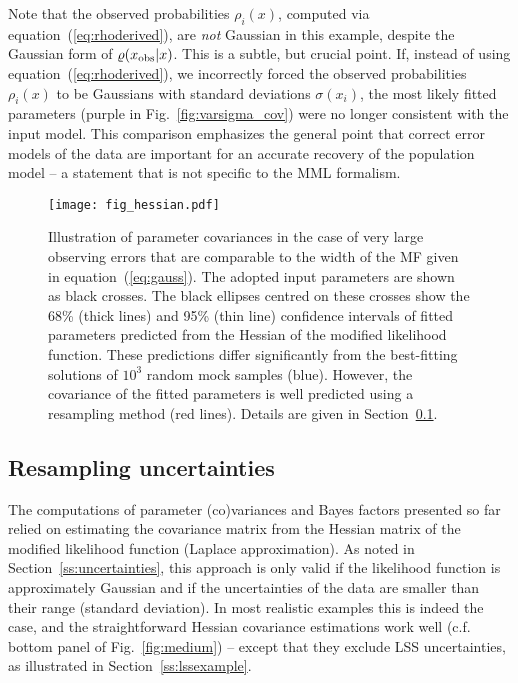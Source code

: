 \documentclass[a4paper,fleqn,usenatbib]{mnras}
\newcommand{\fig}[1]{Fig.~\ref{fig:#1}}
\newcommand{\eq}[1]{equation~(\ref{eq:#1})}
\renewcommand{\ss}[1]{Section~\ref{ss:#1}}
\newcommand{\cf}{c.f.\xspace}
\begin{document}
Note that the observed probabilities $\rho_i(x)$, computed via \eq{rhoderived}, are \emph{not} Gaussian in this example, despite the Gaussian form of $\varrho(x_{\rm obs}|x)$. This is a subtle, but crucial point. If, instead of using \eq{rhoderived}, we incorrectly forced the observed probabilities $\rho_i(x)$ to be Gaussians with standard deviations $\sigma(x_i)$, the most likely fitted parameters (purple in \fig{varsigma_cov}) were no longer consistent with the input model. This comparison emphasizes the general point that correct error models of the data are important for an accurate recovery of the population model -- a statement that is not specific to the MML formalism.

\begin{figure}
\begin{center}
\texttt{[image: fig\_hessian.pdf]}\vspace{0.1cm}
\caption{Illustration of parameter covariances in the case of very large observing errors that are comparable to the width of the MF given in \eq{gauss}. The adopted input parameters are shown as black crosses. The black ellipses centred on these crosses show the 68\% (thick lines) and 95\% (thin line) confidence intervals of fitted parameters predicted from the Hessian of the modified likelihood function. These predictions differ significantly from the best-fitting solutions of $10^3$ random mock samples (blue). However, the covariance of the fitted parameters is well predicted using a resampling method (red lines). Details are given in \ss{resampling}.}\label{fig:resampling}
\end{center}
\end{figure}

\subsection{Resampling uncertainties}\label{ss:resampling}

The computations of parameter (co)variances and Bayes factors presented so far relied on estimating the covariance matrix from the Hessian matrix of the modified likelihood function (Laplace approximation). As noted in \ss{uncertainties}, this approach is only valid if the likelihood function is approximately Gaussian and if the uncertainties of the data are smaller than their range (standard deviation). In most realistic examples this is indeed the case, and the straightforward Hessian covariance estimations work well (\cf bottom panel of \fig{medium}) -- except that they exclude LSS uncertainties, as illustrated in \ss{lssexample}.
\end{document}
